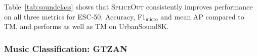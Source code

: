 \documentclass{article}
\newcommand{\SpA}{{\textsc{SpliceOut}}\xspace}
\begin{document}

Table~\ref{tab:soundclass} shows that \SpA consistently improves performance on all three metrics for ESC-50, Accuracy, F1$_{\text{micro}}$ and mean AP compared to TM, and performs as well as TM on UrbanSound8K.

\subsubsection{Music Classification: GTZAN}
\end{document}
